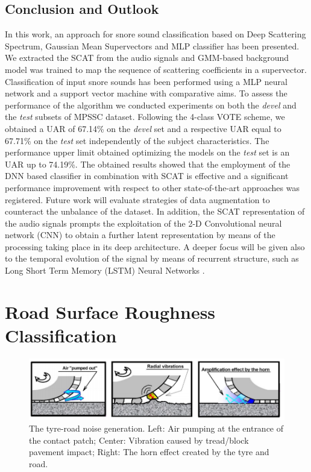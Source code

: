 \subsection{Conclusion and Outlook}
\label{section:concl}

In this work, an approach for snore sound classification based on Deep Scattering Spectrum, Gaussian Mean Supervectors and MLP classifier has been presented. We extracted the SCAT from the audio signals and GMM-based background model was trained to map the sequence of scattering coefficients in a supervector. Classification of input snore sounds has been performed using a MLP neural network and a support vector machine with comparative aims. To assess the performance of the algorithm we conducted experiments on both the \textit{devel} and the \textit{test} subsets of MPSSC dataset.
Following the 4-class VOTE scheme, we obtained a UAR of 67.14\% on the \textit{devel} set and a respective UAR equal to 67.71\% on the \textit{test} set independently of the subject characteristics. 
The performance upper limit obtained optimizing the models on the \textit{test} set is an UAR up to 74.19\%.
The obtained results showed that the employment of the DNN based classifier in combination with SCAT is effective and a significant performance improvement with respect to other state-of-the-art approaches was registered. 
Future work will evaluate strategies of data augmentation to counteract the unbalance of the dataset. In addition, the SCAT representation of the audio signals prompts the exploitation of the 2-D Convolutional neural network (CNN) to obtain a further latent representation by means of the processing taking place in its deep architecture.
A deeper focus will be given also to the temporal evolution of the signal by means of recurrent structure, such as Long Short Term Memory (LSTM) Neural Networks \cite{graves2005framewise}. 
\newpage





\newpage
\section{Road Surface Roughness Classification}
	
	\begin{figure}[h]
		\centering
		\includegraphics[width=\textwidth]{img/pompaevibrazionihorn.png}
		\caption[Tyre-Road Noises]{The tyre-road noise generation. Left:  Air pumping at the entrance of the contact patch; Center: Vibration caused by tread/block pavement impact; Right: The horn effect created by the tyre and road.}
		\label{fig:tyre-road-noise}
	\end{figure}
	
